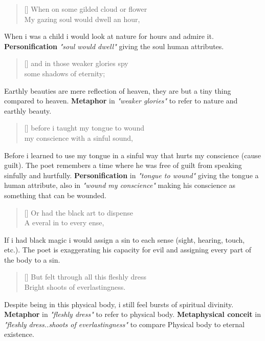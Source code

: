 \begin{verse}[\versewidth]
{\fontverse
When on some gilded cloud or flower\\
My gazing soul would dwell an hour, 
} 
\end{verse}

When i was a child i would look at nature for hours and admire it.
\textbf{Personification} \textit{"soul would dwell"} giving the soul
human attributes. 

\begin{verse}[\versewidth]
{\fontverse
and in those weaker glories spy\\
some shadows of eternity;
} 
\end{verse}

Earthly beauties are mere reflection of heaven, they are 
but a tiny thing compared to heaven. \textbf{Metaphor} in 
\textit{"weaker glories"} to refer to nature and earthly beauty. 

\begin{verse}[\versewidth]
{\fontverse
before i taught my tongue to wound\\
my conscience with a sinful sound, 
} 
\end{verse}

Before i learned to use my tongue in a sinful way that hurts
my conscience (cause guilt). The poet remembers a time where he was free of guilt 
from speaking sinfully and hurtfully. \textbf{Personification} in \textit{"tongue to wound"}
giving the tongue a human attribute, also in \textit{"wound my conscience"} making 
his conscience as something that can be wounded. 

\begin{verse}[\versewidth]
{\fontverse
Or had the black art to dispense\\
A everal in to every ense, 
} 
\end{verse}

If i had black magic i would assign a sin to each sense (sight, hearing, touch, etc.).
The poet is exaggerating his capacity for evil and assigning every part of the body to a sin.


\begin{verse}[\versewidth]
{\fontverse
But felt through all this fleshly dress\\
Bright shoots of everlastingness.
} 
\end{verse}

Despite being in this physical body, i still feel bursts of spiritual divinity.
 \textbf{Metaphor} in \textit{"fleshly dress"} to refer to physical body. \textbf{Metaphysical conceit}
in \textit{"fleshly dress..shoots of everlastingness"} to compare 
Physical body to eternal existence.



